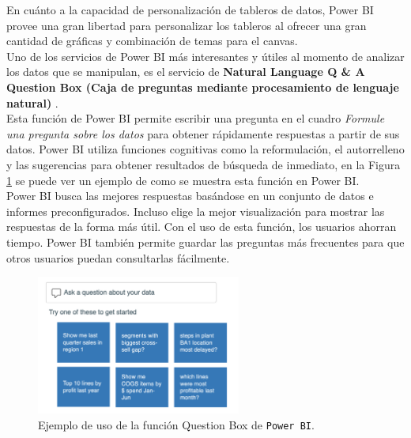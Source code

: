 En cuánto a la capacidad de personalización de tableros de datos, Power BI provee una gran libertad para personalizar los tableros al ofrecer una gran cantidad de gráficas y combinación de temas para el canvas.\\

Uno de los servicios de Power BI más interesantes y útiles al momento de analizar los datos que se manipulan, es el servicio de \textbf{Natural Language Q \& A Question Box (Caja de preguntas mediante procesamiento de lenguaje natural)} \cite{ivision_power_bi_usage}.\\
Esta función de Power BI permite escribir una pregunta en el cuadro \textit{Formule una pregunta sobre los datos} para obtener rápidamente respuestas a partir de sus datos. Power BI utiliza funciones cognitivas como la reformulación, el autorrelleno y las sugerencias para obtener resultados de búsqueda de inmediato, en la Figura \ref{fig:power_bi_nlp} se puede ver un ejemplo de como se muestra esta función en Power BI.\\
Power BI busca las mejores respuestas basándose en un conjunto de datos e informes preconfigurados. Incluso elige la mejor visualización para mostrar las respuestas de la forma más útil.
Con el uso de esta función, los usuarios ahorran tiempo. Power BI también  permite guardar las preguntas más frecuentes para que otros usuarios puedan consultarlas fácilmente.\\


    \begin{figure}[H]
        \centering
        \includegraphics[width=0.6\textwidth]{images/power_bi_Q&A.png}
        \caption{Ejemplo de uso de la función Question Box de \texttt{Power BI}.} \label{fig:power_bi_nlp}
    \end{figure}

